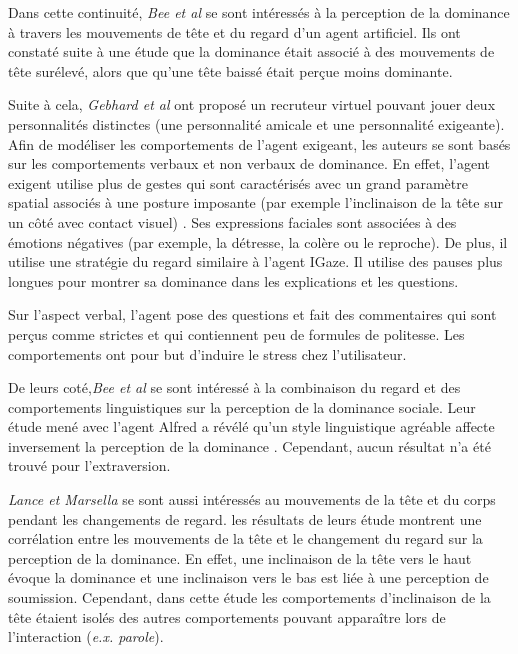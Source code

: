 		Dans cette continuité, \emph{Bee et al} \cite{bee2009relations} se sont intéressés à la perception de la dominance à travers les mouvements de tête et du regard d'un agent artificiel. Ils ont constaté suite à une étude que la dominance était associé à des mouvements de tête surélevé, alors que qu'une tête baissé était perçue moins dominante.
		
		Suite à cela, \emph{Gebhard et al} \cite{gebhard2014exploring} ont proposé un recruteur virtuel pouvant jouer deux personnalités distinctes (une personnalité amicale et une personnalité exigeante). Afin de modéliser les comportements de l'agent exigeant, les auteurs se sont basés sur les comportements verbaux et non verbaux de dominance. En effet, l'agent exigent utilise plus de gestes qui sont caractérisés avec un grand paramètre spatial associés à une posture imposante (par exemple l'inclinaison de la tête sur un côté avec  contact visuel) \cite{gebhard2014exploring}. Ses expressions faciales sont associées à des émotions négatives (par exemple, la détresse, la colère ou le reproche). De plus, il utilise une stratégie du regard similaire à l'agent IGaze.
		Il utilise des pauses plus longues pour montrer sa dominance dans les explications et les questions. 
		
		Sur l'aspect verbal, l'agent pose des questions et fait des commentaires qui sont perçus comme strictes et qui contiennent peu de formules de politesse. 
		 Les comportements ont pour but d'induire le stress chez l'utilisateur. 
		
		De leurs coté,\emph{Bee et al} \cite{bee2010bossy} se sont intéressé à la combinaison du regard et des comportements linguistiques sur la perception de la dominance sociale.  Leur étude mené avec l'agent Alfred a révélé qu'un style linguistique agréable affecte inversement la perception de la dominance \cite{bee2010bossy}. Cependant, aucun résultat n'a été trouvé pour l'extraversion. 
		
		 \emph{Lance et Marsella} \cite{lance2008relation,lance2007emotionally} se sont aussi intéressés au mouvements de la tête et du corps pendant les changements de regard. les résultats de leurs étude montrent une corrélation entre les mouvements de la tête et le changement du regard sur la perception de la dominance. En effet, une inclinaison de la tête vers le haut évoque la dominance et une inclinaison vers le bas est liée à une perception de soumission. Cependant, dans cette étude les comportements d'inclinaison de la tête étaient isolés des autres comportements pouvant apparaître lors de l'interaction (\emph{e.x. parole}).
		
